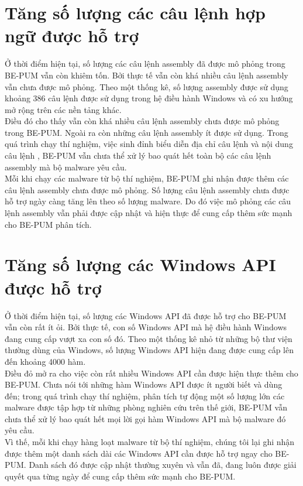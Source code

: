\section{Tăng số lượng các câu lệnh hợp ngữ được hỗ trợ}
		Ở thời điểm hiện tại, số lượng các câu lệnh assembly đã được mô phỏng trong BE-PUM vẫn còn khiêm tốn. Bởi thực tế vẫn còn khá nhiều câu lệnh assembly vẫn chưa được mô phỏng. Theo một thống kê, số lượng assembly được sử dụng khoảng 386 câu lệnh được sử dụng trong hệ điều hành Windows và có xu hướng mở rộng trên các nền tảng khác.\\
		
		Điều đó cho thấy vẫn còn khá nhiều câu lệnh assembly chưa được mô phỏng trong BE-PUM. Ngoài ra còn những câu lệnh assembly ít được sử dụng. Trong quá trình chạy thí nghiệm, việc sinh đỉnh biểu diễn địa chỉ câu lệnh và nội dung câu lệnh , BE-PUM vẫn chưa thể xử lý bao quát hết toàn bộ các câu lệnh assembly mà bộ malware yêu cầu.\\
		
		Mỗi khi chạy các malware từ bộ thí nghiệm, BE-PUM ghi nhận được thêm các câu lệnh assembly chưa được mô phỏng. Số lượng câu lệnh assembly chưa được hỗ trợ ngày càng tăng lên theo số lượng malware. Do đó việc mô phỏng các câu lệnh assembly vẫn phải được cập nhật và hiện thực để cung cấp thêm sức mạnh cho BE-PUM phân tích.

\section{Tăng số lượng các Windows API được hỗ trợ}

Ở thời điểm hiện tại, số lượng các Windows API đã được hỗ trợ cho BE-PUM vẫn còn rất ít ỏi. Bởi thực tế, con số Windows API mà hệ điều hành Windows đang cung cấp vượt xa con số đó. Theo một thống kê nhỏ từ những bộ thư viện thường dùng của Windows, số lượng Windows API hiện đang được cung cấp lên đến khoảng 4000 hàm.\\

Điều đỏ mở ra cho việc còn rất nhiều Windows API cần được hiện thực thêm cho BE-PUM. Chưa nói tới những hàm Windows API được ít người biết và dùng đến; trong quá trình chạy thí nghiệm, phân tích tự động một số lượng lớn các malware được tập hợp từ những phòng nghiên cứu trên thế giới, BE-PUM vẫn chưa thể xử lý bao quát hết mọi lời gọi hàm Windows API mà bộ malware đó yêu cầu.\\

Vì thế, mỗi khi chạy hàng loạt malware từ bộ thí nghiệm, chúng tôi lại ghi nhận được thêm một danh sách dài các Windows API cần được hỗ trợ ngay cho BE-PUM. Danh sách đó được cập nhật thường xuyên và vẫn đã, đang luôn được giải quyết qua từng ngày để cung cấp thêm sức mạnh cho BE-PUM.

